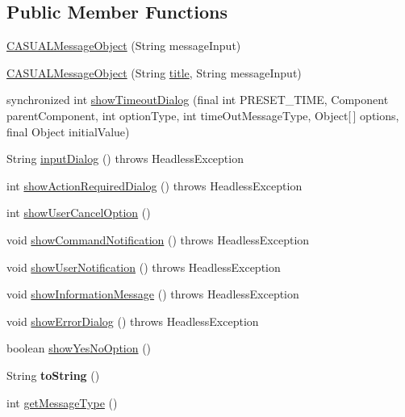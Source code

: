 \subsection*{Public Member Functions}
\begin{DoxyCompactItemize}
\item 
\hyperlink{class_c_a_s_u_a_l_1_1_c_a_s_u_a_l_message_object_ae826dde1386a7040749cc429e40400b5}{C\-A\-S\-U\-A\-L\-Message\-Object} (String message\-Input)
\item 
\hyperlink{class_c_a_s_u_a_l_1_1_c_a_s_u_a_l_message_object_a92b199db10f96ecbc9be1b26344e82b6}{C\-A\-S\-U\-A\-L\-Message\-Object} (String \hyperlink{class_c_a_s_u_a_l_1_1_c_a_s_u_a_l_message_object_aa05172adf910fdff74387ea7e8a1c03f}{title}, String message\-Input)
\item 
synchronized int \hyperlink{class_c_a_s_u_a_l_1_1_c_a_s_u_a_l_message_object_ab3fadda258eb806df25a718b9df11a79}{show\-Timeout\-Dialog} (final int P\-R\-E\-S\-E\-T\-\_\-\-T\-I\-M\-E, Component parent\-Component, int option\-Type, int time\-Out\-Message\-Type, Object\mbox{[}$\,$\mbox{]} options, final Object initial\-Value)
\item 
String \hyperlink{class_c_a_s_u_a_l_1_1_c_a_s_u_a_l_message_object_a044a50f100490ac815197597bc2b0cc3}{input\-Dialog} ()  throws Headless\-Exception 
\item 
int \hyperlink{class_c_a_s_u_a_l_1_1_c_a_s_u_a_l_message_object_a94d3197760f77cdbd6b60fbf874976bc}{show\-Action\-Required\-Dialog} ()  throws Headless\-Exception 
\item 
int \hyperlink{class_c_a_s_u_a_l_1_1_c_a_s_u_a_l_message_object_acacbc59bd2fcd53f7746d8e8966377a5}{show\-User\-Cancel\-Option} ()
\item 
void \hyperlink{class_c_a_s_u_a_l_1_1_c_a_s_u_a_l_message_object_af1731a686ae654acc68823c3249bbd1c}{show\-Command\-Notification} ()  throws Headless\-Exception 
\item 
void \hyperlink{class_c_a_s_u_a_l_1_1_c_a_s_u_a_l_message_object_a10b91cd75cc6620e93b546d19cbcf995}{show\-User\-Notification} ()  throws Headless\-Exception 
\item 
void \hyperlink{class_c_a_s_u_a_l_1_1_c_a_s_u_a_l_message_object_abf3fa13e8cf477d6e74bd1c7846e04c9}{show\-Information\-Message} ()  throws Headless\-Exception 
\item 
void \hyperlink{class_c_a_s_u_a_l_1_1_c_a_s_u_a_l_message_object_aefd0003f0c1f298da3f5af1107384d2c}{show\-Error\-Dialog} ()  throws Headless\-Exception 
\item 
boolean \hyperlink{class_c_a_s_u_a_l_1_1_c_a_s_u_a_l_message_object_a1c209c028596425d20c826173586222c}{show\-Yes\-No\-Option} ()
\item 
\hypertarget{class_c_a_s_u_a_l_1_1_c_a_s_u_a_l_message_object_ac8a0988dc5cf17880f435ffbcd7b6f31}{String {\bfseries to\-String} ()}\label{class_c_a_s_u_a_l_1_1_c_a_s_u_a_l_message_object_ac8a0988dc5cf17880f435ffbcd7b6f31}

\item 
int \hyperlink{class_c_a_s_u_a_l_1_1_c_a_s_u_a_l_message_object_a2914cefd9d160675a9613c5857dcf855}{get\-Message\-Type} ()
\end{DoxyCompactItemize}
